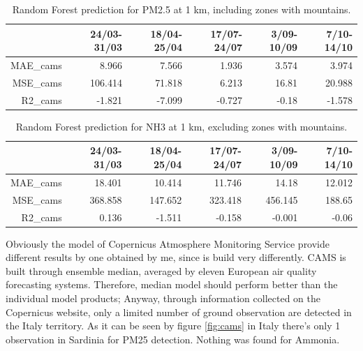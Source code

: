 \begin{table}[H]
\begin{tabular}{rrrrrr}
\hline
     &   24/03-31/03 &   18/04-25/04 &   17/07-24/07 &   3/09-10/09 &   7/10-14/10 \\
\hline
   MAE\_cams     &            8.966 &            7.566 &            1.936 &            3.574 &            3.974 \\
  MSE\_cams     &          106.414 &           71.818 &            6.213 &           16.81  &           20.988 \\
   R2\_cams      &           -1.821 &           -7.099 &           -0.727 &           -0.18  &           -1.578 \\
\hline
\end{tabular}
\caption{Random Forest prediction for PM2.5 at 1 km, including zones with mountains.}
\end{table}
\begin{table}[H]
\begin{tabular}{rrrrrr}
\hline
     &   24/03-31/03 &   18/04-25/04 &   17/07-24/07 &   3/09-10/09 &   7/10-14/10 \\
\hline
  MAE\_cams     &           18.401 &           10.414 &           11.746 &           14.18  &           12.012 \\
  MSE\_cams     &          368.858 &          147.652 &          323.418 &          456.145 &          188.65  \\
  R2\_cams      &            0.136 &           -1.511 &           -0.158 &           -0.001 &           -0.06  \\
\hline
\end{tabular}
\caption{Random Forest prediction for NH3 at 1 km, excluding zones with mountains.}
\end{table}
Obviously the model of Copernicus Atmosphere Monitoring Service provide different results by one obtained by me, since is build very differently. CAMS is built through ensemble median, averaged by eleven European air quality forecasting systems. Therefore, median model should perform better than the individual model products\cite{riccio2007seeking}; 
Anyway, through information collected on the Copernicus website, only a limited number of ground observation are detected in the Italy territory. As it can be seen by figure \ref{fig:cams} in Italy there's only 1 observation in Sardinia for PM25 detection. Nothing was found for Ammonia.
